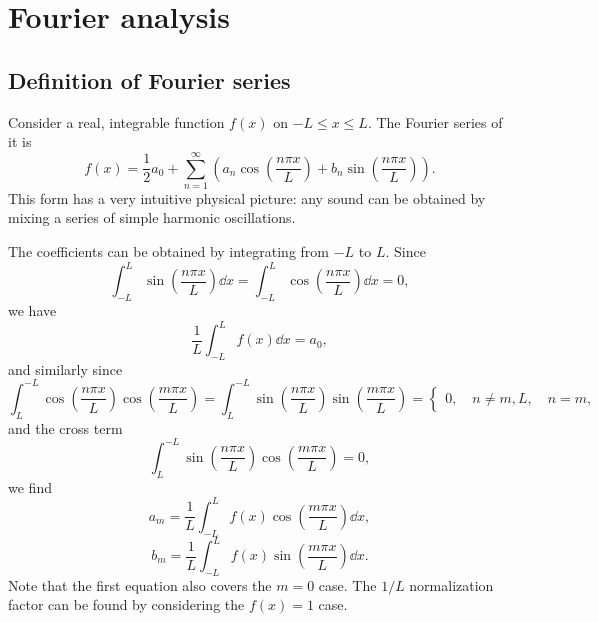 \documentclass[hyperref, a4paper]{article}
\def\\{}%
\begin{document}
\section{Fourier analysis}

\subsection{Definition of Fourier series}

Consider a real, integrable function $f(x)$ on $- L \leq x \leq L$.
The Fourier series of it is 
\begin{equation}
    f(x) = \frac{1}{2} a_0 + \sum_{n=1}^{\infty} \left(
        a_n \cos(\frac{n \pi x}{L})
        + b_n \sin(\frac{n \pi x}{L})
    \right).
\end{equation}
This form has a very intuitive physical picture: 
any sound can be obtained by mixing a series of 
simple harmonic oscillations. 

The coefficients can be obtained by integrating from $-L$ to $L$. 
Since 
\begin{equation}
    \int_{-L}^{L} \sin(\frac{n \pi x}{L}) \dd{x} = 
    \int_{-L}^{L} \cos(\frac{n \pi x}{L}) \dd{x} = 0,
\end{equation}
we have 
\begin{equation}
    \frac{1}{L} \int_{-L}^{L} f(x) \dd{x} = a_0,
\end{equation}
and similarly since 
\begin{equation}
    \int_{L}^{-L} \cos(\frac{n \pi x}{L}) \cos(\frac{m \pi x}{L}) = 
    \int_{L}^{-L} \sin(\frac{n \pi x}{L}) \sin(\frac{m \pi x}{L}) = 
    \begin{cases}
        0, \quad n \neq m, \\
        L, \quad n = m,
    \end{cases}
\end{equation}
and the cross term 
\begin{equation} 
    \int_{L}^{-L} \sin(\frac{n \pi x}{L}) \cos(\frac{m \pi x}{L}) = 0,
\end{equation}
we find 
\begin{equation}
    a_m = \frac{1}{L} \int_{-L}^{L} f(x) \cos(\frac{m \pi x}{L}) \dd{x}, 
\end{equation}
\begin{equation}
    b_m = \frac{1}{L} \int_{-L}^{L} f(x) \sin(\frac{m \pi x}{L}) \dd{x}.
\end{equation}
Note that the first equation also covers the $m = 0$ case. 
The $1 / L$ normalization factor can be found by considering the $f(x) = 1$ case. 
\end{document}
